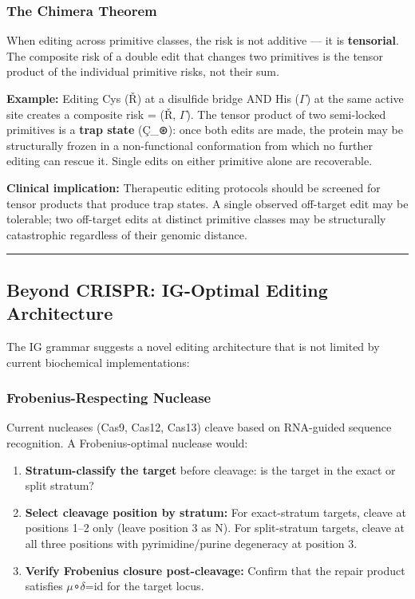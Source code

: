 \documentclass[12pt,a4paper]{article}
\begin{document}
\subsubsection{The Chimera Theorem}

When editing across primitive classes, the risk is not additive --- it is \textbf{tensorial}. The composite risk of a double edit that changes two primitives is the tensor product of the individual primitive risks, not their sum.

\textbf{Example:} Editing Cys (Ř) at a disulfide bridge AND His ($\Gamma$) at the same active site creates a composite risk = \otimes(Ř, $\Gamma$). The tensor product of two semi-locked primitives is a \textbf{trap state} (Ç\_⊛): once both edits are made, the protein may be structurally frozen in a non-functional conformation from which no further editing can rescue it. Single edits on either primitive alone are recoverable.

\textbf{Clinical implication:} Therapeutic editing protocols should be screened for tensor products that produce trap states. A single observed off-target edit may be tolerable; two off-target edits at distinct primitive classes may be structurally catastrophic regardless of their genomic distance.

\begin{center}
\rule{0.5\textwidth}{0.4pt}
\end{center}

\subsection{Beyond CRISPR: IG-Optimal Editing Architecture}

The IG grammar suggests a novel editing architecture that is not limited by current biochemical implementations:

\subsubsection{Frobenius-Respecting Nuclease}

Current nucleases (Cas9, Cas12, Cas13) cleave based on RNA-guided sequence recognition. A Frobenius-optimal nuclease would:

\begin{enumerate}
    \item \textbf{Stratum-classify the target} before cleavage: is the target in the exact or split stratum?
    \item \textbf{Select cleavage position by stratum:} For exact-stratum targets, cleave at positions 1--2 only (leave position 3 as N). For split-stratum targets, cleave at all three positions with pyrimidine/purine degeneracy at position 3.
    \item \textbf{Verify Frobenius closure post-cleavage:} Confirm that the repair product satisfies $\mu$∘$\delta$=id for the target locus.
\end{enumerate}
\end{document}

